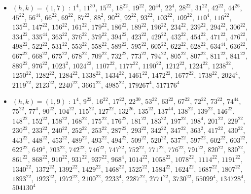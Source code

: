 \begin{itemize}
\item $(h,k)=(1,7)$ : $1^{4}$, $11^{30}$, $15^{22}$, $18^{22}$, $19^{22}$, $20^{44}$, $22^{4}$, $28^{22}$, $31^{22}$, $42^{22}$, $44^{26}$, $45^{22}$, $56^{44}$, $66^{22}$, $69^{22}$, $87^{22}$, $88^{2}$, $90^{22}$, $92^{22}$, $93^{22}$, $103^{22}$, $109^{22}$, $110^{4}$, $116^{22}$, $135^{22}$, $147^{22}$, $156^{22}$, $161^{22}$, $179^{22}$, $186^{22}$, $189^{22}$, $196^{22}$, $234^{22}$, $239^{22}$, $294^{22}$, $306^{22}$, $334^{22}$, $335^{44}$, $363^{22}$, $376^{22}$, $379^{22}$, $394^{22}$, $423^{22}$, $429^{22}$, $432^{22}$, $454^{22}$, $471^{22}$, $476^{22}$, $498^{22}$, $522^{22}$, $531^{22}$, $553^{22}$, $558^{22}$, $589^{22}$, $595^{22}$, $605^{22}$, $622^{22}$, $628^{22}$, $634^{44}$, $636^{22}$, $667^{22}$, $668^{22}$, $675^{22}$, $678^{22}$, $709^{22}$, $732^{22}$, $773^{22}$, $794^{22}$, $805^{22}$, $807^{22}$, $811^{22}$, $841^{22}$, $889^{22}$, $976^{22}$, $1023^{2}$, $1024^{22}$, $1107^{22}$, $1177^{22}$, $1190^{22}$, $1212^{22}$, $1224^{22}$, $1238^{22}$, $1250^{22}$, $1282^{22}$, $1284^{22}$, $1338^{22}$, $1434^{22}$, $1461^{22}$, $1472^{22}$, $1677^{22}$, $1738^{22}$, $2024^{4}$, $2119^{22}$, $2123^{22}$, $2240^{22}$, $3661^{22}$, $4985^{22}$, $179267^{4}$, $517176^{4}$
\item $(h,k)=(1,9)$ : $1^{4}$, $9^{22}$, $16^{22}$, $17^{22}$, $22^{30}$, $53^{22}$, $63^{22}$, $67^{22}$, $72^{22}$, $73^{22}$, $74^{44}$, $75^{22}$, $77^{4}$, $90^{22}$, $104^{22}$, $115^{22}$, $127^{22}$, $132^{26}$, $135^{22}$, $137^{44}$, $138^{22}$, $139^{22}$, $146^{22}$, $148^{22}$, $152^{22}$, $158^{22}$, $168^{22}$, $175^{22}$, $176^{22}$, $181^{22}$, $183^{22}$, $197^{22}$, $198^{4}$, $201^{22}$, $229^{22}$, $230^{22}$, $233^{22}$, $240^{22}$, $252^{22}$, $253^{22}$, $287^{22}$, $293^{22}$, $342^{22}$, $347^{22}$, $363^{2}$, $417^{22}$, $430^{22}$, $443^{22}$, $448^{22}$, $453^{22}$, $489^{22}$, $493^{22}$, $494^{22}$, $509^{22}$, $520^{22}$, $537^{22}$, $597^{22}$, $602^{22}$, $603^{22}$, $622^{22}$, $649^{4}$, $703^{22}$, $742^{22}$, $746^{22}$, $747^{22}$, $752^{22}$, $771^{22}$, $776^{22}$, $791^{22}$, $820^{22}$, $830^{22}$, $861^{22}$, $868^{22}$, $910^{22}$, $931^{22}$, $937^{22}$, $968^{4}$, $1014^{22}$, $1058^{22}$, $1078^{22}$, $1114^{22}$, $1191^{22}$, $1340^{22}$, $1372^{22}$, $1392^{22}$, $1429^{22}$, $1468^{22}$, $1525^{22}$, $1584^{22}$, $1624^{22}$, $1687^{22}$, $1807^{22}$, $1893^{22}$, $1923^{22}$, $1972^{22}$, $2100^{22}$, $2233^{4}$, $2287^{22}$, $2771^{22}$, $3730^{22}$, $55099^{4}$, $134728^{4}$, $504130^{4}$

\end{itemize}
